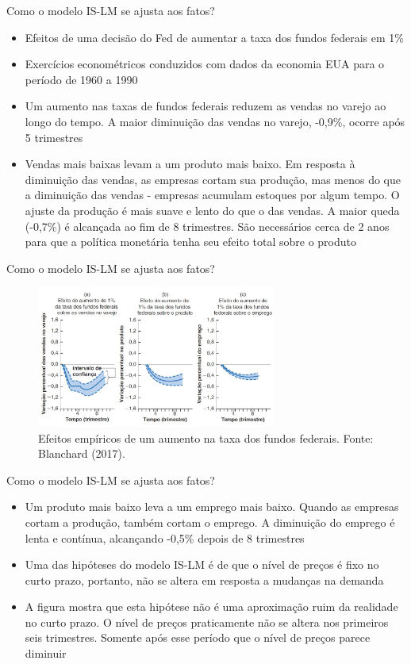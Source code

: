 \documentclass[10pt]{beamer}
\begin{document}
\begin{frame}{Como o modelo IS-LM se ajusta aos fatos?}
\begin{itemize}
    \item Efeitos de uma decisão do Fed de aumentar a taxa dos fundos federais em 1\%
    \bigskip
    \item Exercícios econométricos conduzidos com dados da economia EUA para o período de 1960 a 1990
    \bigskip
    \item Um aumento nas taxas de fundos federais reduzem as vendas no varejo ao longo do tempo. A maior diminuição das vendas no varejo, -0,9\%, ocorre após 5 trimestres
    \bigskip
    \item Vendas mais baixas levam a um produto mais baixo. Em resposta à diminuição das vendas, as empresas cortam sua produção, mas menos do que a diminuição das vendas - empresas acumulam estoques por algum tempo. O ajuste da produção é mais suave e lento do que o das vendas. A maior queda (-0,7\%) é alcançada ao fim de 8 trimestres. São necessários cerca de 2 anos para que a política monetária tenha seu efeito total sobre o produto
\end{itemize}
\end{frame}

\begin{frame}{Como o modelo IS-LM se ajusta aos fatos?}
\begin{figure}
    \centering
    \includegraphics[width=0.7\textwidth]{./figures/aula082_fig15.JPG}
    \caption{Efeitos empíricos de um aumento na taxa dos fundos federais. Fonte: Blanchard (2017).}
    \label{fig9}
\end{figure}
\end{frame}

\begin{frame}{Como o modelo IS-LM se ajusta aos fatos?}
\begin{itemize}
    \item Um produto mais baixo leva a um emprego mais baixo. Quando as empresas cortam a produção, também cortam o emprego. A diminuição do emprego é lenta e contínua, alcançando -0,5\% depois de 8 trimestres
    \bigskip
    \item Uma das hipóteses do modelo IS-LM é de que o nível de preços é fixo no curto prazo, portanto, não se altera em resposta a mudanças na demanda
    \bigskip
    \item A figura mostra que esta hipótese não é uma aproximação ruim da realidade no curto prazo. O nível de preços praticamente não se altera nos  primeiros seis trimestres. Somente após esse período que o nível de preços parece diminuir
\end{itemize}
\end{frame}
\end{document}
